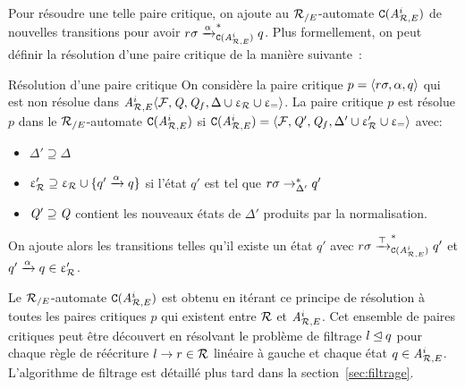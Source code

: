 Pour résoudre une telle paire critique, on ajoute au ${\mathcal R_{/E}}$-automate $\mathtt{C}({\mathit A}_{\mathcal R,E}^i)$
de nouvelles transitions pour avoir $r\sigma \xrightarrow{\alpha}_{\mathtt{C}({\mathit A}_{\mathcal R,E}^{i})}^* q$.
Plus formellement, on peut définir la résolution d'une paire critique de la manière suivante~:

\begin{definition}{Résolution d'une paire critique}
  \label{def:resolution_cp}
  On considère la paire critique $p=\langle r\sigma, \alpha, q \rangle$ qui est non résolue dans
  ${\mathit A}_{\mathcal R,E}^i \langle \mathcal{F}, \mathit Q, \mathit Q_f, \Delta\cup \upvarepsilon_{\mathcal R}\cup \upvarepsilon_{=} \rangle$.
  La paire critique $p$ est résolue $p$ dans le ${\mathcal R_{/E}}$-automate $\mathtt{C}({\mathit A}_{\mathcal R,E}^i)$
  si $\mathtt{C}({\mathit A}_{\mathcal R,E}^i) = \langle \mathcal{F}, \mathit Q', \mathit Q_f, \Delta'\cup \upvarepsilon_{\mathcal R}'\cup \upvarepsilon_{=} \rangle$ avec:
  \begin{itemize}
  \item $\Delta'\supseteq \Delta$%
  \item $\upvarepsilon_{\mathcal R}'\supseteq \upvarepsilon_{\mathcal R} \cup \{q' \xrightarrow{\alpha} q\}$ si l'état $q'$ est tel que $r\sigma \rightarrow^*_{\Delta'} q'$
  \item $\mathit Q' \supseteq \mathit Q$ contient les nouveaux états de $\Delta'$ produits par la normalisation.
  \end{itemize}
\end{definition}

On ajoute alors les transitions telles qu'il existe un état $q'$ avec
$r\sigma \xrightarrow{\top}_{\mathtt{C}({\mathit A}_{\mathcal R,E}^i)}^* q'$ et $q'\xrightarrow{\alpha} q \in \upvarepsilon_{\mathcal R}'$. 

Le ${\mathcal R_{/E}}$-automate $\mathtt{C}({\mathit A}_{\mathcal R,E}^i)$ est obtenu en itérant ce
principe de résolution à toutes les paires critiques $p$ qui existent
entre $\mathcal R$ et ${\mathit A}_{\mathcal R,E}^i$. Cet ensemble de paires critiques peut être découvert
en résolvant le problème de filtrage $l \unlhd q$ pour chaque règle de
réécriture $l \rightarrow r\in \mathcal R$ linéaire à gauche et chaque état $q\in{\mathit A}_{\mathcal R,E}^i$.
L'algorithme de filtrage est détaillé plus tard dans la section~\ref{sec:filtrage}.

